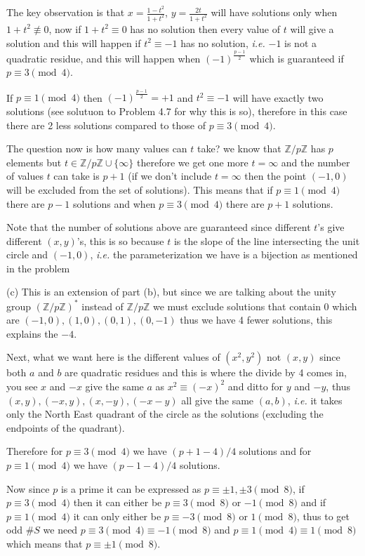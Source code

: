 \documentclass[aps,preprint,preprintnumbers,nofootinbib,showpacs,prd]{revtex4-1}
\newcommand{\ie}{{\it i.e.} }
\begin{document}
The key observation is that $x = \frac{1-t^2}{1 + t^2}$,  $y = \frac{2t} {1 + t^2}$ will have solutions only when $1+t^2 \not\equiv 0$, now if $1+t^2 \equiv 0$ has no solution then every value of $t$ will give a solution and this will happen if $t^2 \equiv -1$ has no solution, \ie $-1$ is not a quadratic residue, and this will happen when $(-1)^{\frac{p-1}{2}}$ which is guaranteed if $p \equiv 3 \pmod{4}$.

If $p \equiv 1 \pmod{4}$ then $(-1)^{\frac{p-1}{2}} = +1$ and $t^2 \equiv -1$ will have exactly two solutions (see solutuon to Problem 4.7 for why this is so), therefore in this case there are 2 less solutions compared to those of $p \equiv 3 \pmod{4}$.

The question now is how many values can $t$ take? we know that $\mathbb{Z}/p\mathbb{Z}$ has $p$ elements but $t \in \mathbb{Z}/p\mathbb{Z}\cup\{\infty\}$ therefore we get one more $t = \infty$ and the number of values $t$ can take is $p+1$ (if we don't include $t=\infty$ then the point $(-1,0)$ will be excluded from the set of solutions). This means that if $p \equiv 1 \pmod{4}$ there are $p-1$ solutions and when $p \equiv 3 \pmod{4}$ there are $p+1$ solutions.

Note that the number of solutions above are guaranteed since different $t$'s give different $(x,y)$'s, this is so because $t$ is the slope of the line intersecting the unit circle and $(-1,0)$, \ie the parameterization we have is a bijection as mentioned in the problem

(c) This is an extension of part (b), but since we are talking about the unity group $(\mathbb{Z}/p\mathbb{Z})^*$ instead of $\mathbb{Z}/p\mathbb{Z}$ we must exclude solutions that contain $0$ which are $(-1,0),(1,0),(0,1),(0,-1)$ thus we have 4 fewer solutions, this explains the $-4$.

Next, what we want here is the different values of $(x^2,y^2)$ not $(x,y)$ since both $a$ and $b$ are quadratic residues and this is where the divide by 4 comes in, you see $x$ and $-x$ give the same $a$ as $x^2 \equiv (-x)^2$ and ditto for $y$ and $-y$, thus $(x,y),(-x,y),(x,-y),(-x-y)$ all give the same $(a,b)$, \ie it takes only the North East quadrant of the circle as the solutions (excluding the endpoints of the quadrant).

Therefore for $p \equiv 3 \pmod{4}$ we have $(p+1-4)/4$ solutions and for $p \equiv 1 \pmod{4}$ we have $(p-1-4)/4$ solutions.

Now since $p$ is a prime it can be expressed as $p \equiv \pm1, \pm3 \pmod{8}$, if $p \equiv 3 \pmod{4}$ then it can either be $p \equiv 3 \pmod{8}$ or $-1 \pmod{8}$ and if $p \equiv 1 \pmod{4}$ it can only either be $p \equiv -3 \pmod{8}$ or $1 \pmod{8}$, thus to get odd $\#S$ we need $p \equiv 3 \pmod{4} \equiv -1 \pmod{8}$ and $p \equiv 1 \pmod{4} \equiv 1 \pmod{8}$ which means that $p \equiv \pm 1 \pmod{8}$.
\end{document}
